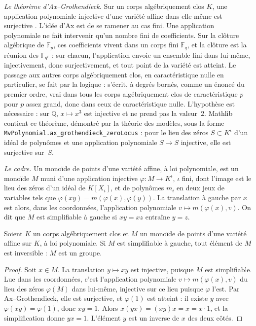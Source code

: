 \noindent\emph{Le théorème d'Ax--Grothendieck.} Sur un corps algébriquement clos $K$, une application polynomiale injective d'une variété affine dans elle-même est surjective \cite{ax1968, borel1969}. L'idée d'Ax est de se ramener au cas fini. Une application polynomiale ne fait intervenir qu'un nombre fini de coefficients. Sur la clôture algébrique de $\mathbb F_p$, ces coefficients vivent dans un corps fini $\mathbb F_q$, et la clôture est la réunion des $\mathbb F_{q^r}$ : sur chacun, l'application envoie un ensemble fini dans lui-même, injectivement, donc surjectivement, et tout point de la variété est atteint. Le passage aux autres corps algébriquement clos, en caractéristique nulle en particulier, se fait par la logique :  s'écrit, à degrés bornés, comme un énoncé du premier ordre, vrai dans tous les corps algébriquement clos de caractéristique $p$ pour $p$ assez grand, donc dans ceux de caractéristique nulle. L'hypothèse  est nécessaire : sur $\mathbb Q$, $x \mapsto x^3$ est injective et ne prend pas la valeur~$2$. Mathlib contient ce théorème, démontré par la théorie des modèles, sous la forme \texttt{MvPolynomial.\allowbreak{}ax\_grothendieck\_zeroLocus} : pour le lieu des zéros $S \subset K^\iota$ d'un idéal de polynômes et une application polynomiale $S \to S$ injective, elle est surjective sur~$S$.

\noindent\emph{Le cadre.} Un monoïde de points d'une variété affine, à loi polynomiale, est un monoïde $M$ muni d'une application injective $\varphi : M \to K^\iota$, $\iota$ fini, dont l'image est le lieu des zéros d'un idéal de $K[X_i]$, et de polynômes $m_i$ en deux jeux de variables tels que $\varphi(xy) = m(\varphi(x), \varphi(y))$. La translation à gauche par $x$ est alors, dans les coordonnées, l'application polynomiale $v \mapsto m(\varphi(x), v)$. On dit que $M$ est simplifiable à gauche si $xy = xz$ entraîne $y = z$.

\begin{encadre}
\begin{enonce}
Soient $K$ un corps algébriquement clos et $M$ un monoïde de points d'une variété affine sur $K$, à loi polynomiale. Si $M$ est simplifiable à gauche, tout élément de $M$ est inversible : $M$ est un groupe.
\end{enonce}
\end{encadre}

\begin{proof}
Soit $x \in M$. La translation $y \mapsto xy$ est injective, puisque $M$ est simplifiable. Lue dans les coordonnées, c'est l'application polynomiale $v \mapsto m(\varphi(x), v)$ du lieu des zéros $\varphi(M)$ dans lui-même, injective sur ce lieu puisque $\varphi$ l'est. Par Ax--Grothendieck, elle est surjective, et $\varphi(1)$ est atteint : il existe $y$ avec $\varphi(xy) = \varphi(1)$, donc $xy = 1$. Alors $x(yx) = (xy)x = x = x \cdot 1$, et la simplification donne $yx = 1$. L'élément $y$ est un inverse de $x$ des deux côtés.
\end{proof}

